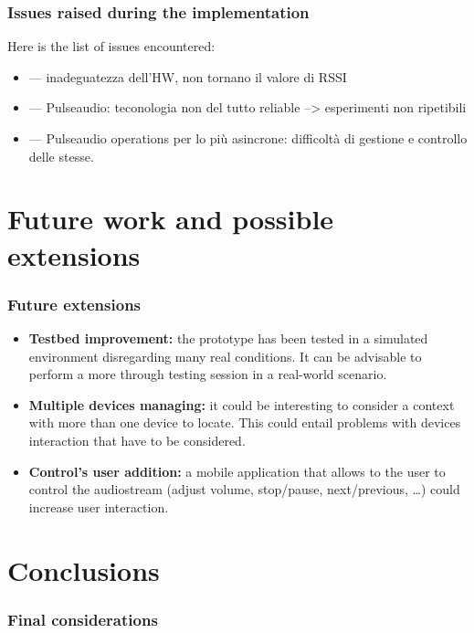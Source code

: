 \documentclass{beamer}
\begin{document}
	\begin{frame}
		\frametitle{Issues raised during the implementation}
		Here is the list of issues encountered:
		\begin{itemize}
		\item --- inadeguatezza dell'HW, non tornano il valore di RSSI
		\item --- Pulseaudio: teconologia non del tutto reliable --> esperimenti non ripetibili
		\item --- Pulseaudio operations per lo più asincrone: difficoltà di gestione e controllo delle stesse.
		\end{itemize}
	\end{frame}
	

\section{Future work and possible extensions}

	
	\begin{frame}
		\frametitle{Future extensions}
		\begin{itemize}
		\item \textbf{Testbed improvement:} the prototype has been tested in a simulated environment disregarding many real conditions. It can be advisable to perform a more through testing session in a real-world scenario. 
		\pause
		\item \textbf{Multiple devices managing:} it could be interesting to consider a context with more than one device to locate. This could entail problems with devices interaction that have to be considered.
		\pause
		\item \textbf{Control's user addition:} a mobile application that allows to the user to control the audiostream (adjust volume, stop/pause, next/previous, \ldots) could increase user interaction.
		\end{itemize}
	\end{frame}
	

\section{Conclusions}
	\begin{frame}
		\frametitle{Final considerations}
	\end{frame}
\end{document}
